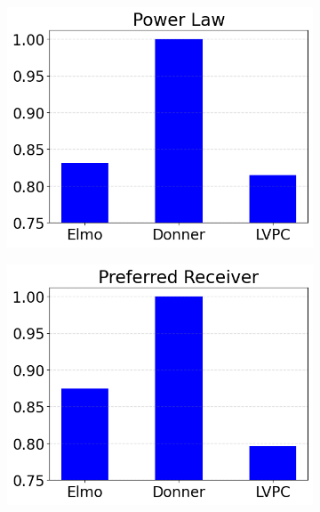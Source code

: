   \begin{figure}
  \begin{subfigure}{.3293\textwidth}
  \includegraphics[width=\textwidth]{../simulation/Fees_power_law.png}
  \end{subfigure}
  \begin{subfigure}{.3293\textwidth}
  \includegraphics[width=\textwidth]{../simulation/Fees_preferred_receiver.png}
  \end{subfigure}
  \begin{subfigure}{.3293\textwidth}

\end{subfigure}
\end{figure}
